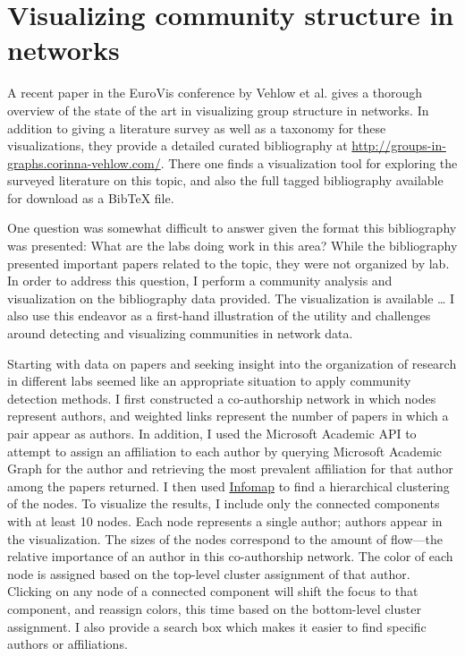 \hypertarget{visualization}{\section{Visualizing community structure in
networks}\label{visualization}}

\protect\hyperlink{visualization}{}

A recent paper in the EuroVis conference by Vehlow et al.
\autocite{vehlow_state_2015} gives a thorough overview of the state of
the art in visualizing group structure in networks. In addition to
giving a literature survey as well as a taxonomy for these
visualizations, they provide a detailed curated bibliography at
\url{http://groups-in-graphs.corinna-vehlow.com/}. There one finds a
visualization tool for exploring the surveyed literature on this topic,
and also the full tagged bibliography available for download as a BibTeX
file.

One question was somewhat difficult to answer given the format this
bibliography was presented: What are the labs doing work in this area?
While the bibliography presented important papers related to the topic,
they were not organized by lab. In order to address this question, I
perform a community analysis and visualization on the bibliography data
provided. The visualization is available \ldots{} I also use this
endeavor as a first-hand illustration of the utility and challenges
around detecting and visualizing communities in network data.

Starting with data on papers and seeking insight into the organization
of research in different labs seemed like an appropriate situation to
apply community detection methods. I first constructed a co-authorship
network in which nodes represent authors, and weighted links represent
the number of papers in which a pair appear as authors. In addition, I
used the Microsoft Academic API  to attempt to assign an
affiliation to each author by querying Microsoft Academic Graph for the
author and retrieving the most prevalent affiliation for that author
among the papers returned. I then used
\protect\hyperlink{the-dynamical-perspective}{Infomap} to find a
hierarchical clustering of the nodes. To visualize the results, I
include only the connected components with at least 10 nodes. Each node
represents a single author;  authors appear in the
visualization. The sizes of the nodes correspond to the amount of
flow---the relative importance of an author in this co-authorship
network. The color of each node is assigned based on the top-level
cluster assignment of that author. Clicking on any node of a connected
component will shift the focus to that component, and reassign colors,
this time based on the bottom-level cluster assignment. I also provide a
search box which makes it easier to find specific authors or
affiliations.

